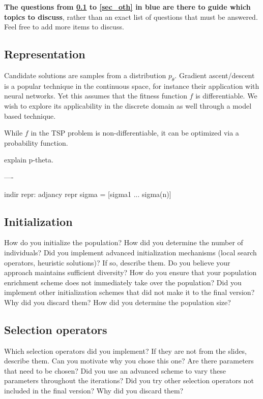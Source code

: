 \documentclass[a4paper,10pt]{article}
\newcommand{\ReplaceMe}[1]{{\color{blue}#1}}
\newcommand{\RemoveMe}[1]{{\color{purple}#1}}
\begin{document}
\RemoveMe{\textbf{The questions from \cref{sec_rep} to \cref{sec_oth} in blue are there to guide which topics to discuss}, rather than an exact list of questions that must be answered. Feel free to add more items to discuss.}

\subsection{Representation}\label{sec_rep}
	
	Candidate solutions are samples from a distribution $p_\theta$.
	Gradient ascent/descent is a popular technique in the continuous space, for instance their application with neural networks. Yet this assumes that the fitness function $f$ is differentiable. We wish to explore its applicability in the discrete domain as well through a model based technique.
	
	While $f$ in the TSP problem is non-differentiable, it can be optimized via a probability function.
	
	explain p-theta.
	
	
	----
	
	indir repr: adjancy repr sigma = [sigma1 ... sigma(n)]

\subsection{Initialization}

\ReplaceMe{How do you initialize the population? How did you determine the number of individuals? Did you implement advanced initialization mechanisms (local search operators, heuristic solutions)? If so, describe them. Do you believe your approach maintains sufficient diversity? How do you ensure that your population enrichment scheme does not immediately take over the population? Did you implement other initialization schemes that did not make it to the final version? Why did you discard them? How did you determine the population size?}

\subsection{Selection operators}

\ReplaceMe{Which selection operators did you implement? If they are not from the slides, describe them. Can you motivate why you chose this one? Are there parameters that need to be chosen? Did you use an advanced scheme to vary these parameters throughout the iterations? Did you try other selection operators not included in the final version? Why did you discard them?}
\end{document}

